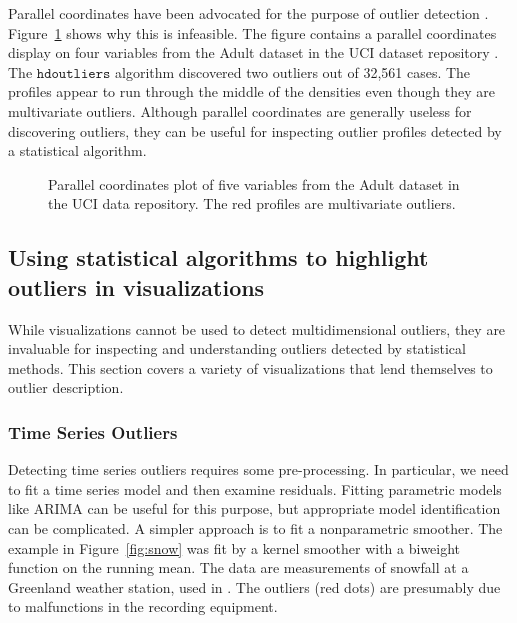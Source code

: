 \documentclass[12pt]{article}
\begin{document}
Parallel coordinates have been advocated for the purpose of outlier detection \citep{Novotny:2006:OFV:1187627.1187805}. Figure~\ref{fig:parallelcoordinates} shows why this is infeasible. The figure contains a parallel coordinates display on four variables from the Adult dataset in the UCI dataset repository \citep{adult}. The $\mathtt{hdoutliers}$ algorithm discovered two outliers out of 32,561 cases. The profiles appear to run through the middle of the densities even though they are multivariate outliers. Although parallel coordinates are generally useless for discovering outliers, they can be useful for inspecting outlier profiles detected by a statistical algorithm.

\begin{figure}[h]
\caption{\label{fig:parallelcoordinates}  Parallel coordinates plot of five variables from the Adult dataset in the UCI data repository. The red profiles are multivariate outliers.}
\end{figure}

\subsection{Using statistical algorithms to highlight outliers in visualizations}
While visualizations cannot be used to detect multidimensional outliers, they are invaluable for inspecting and understanding outliers detected by statistical methods. This section covers a variety of visualizations that lend themselves to outlier description.

\subsubsection{Time Series Outliers}
Detecting time series outliers requires some pre-processing. In particular, we need to fit a time series model and then examine residuals. Fitting parametric models like ARIMA \citep{BoxJenkins} can be useful for this purpose, but appropriate model identification can be complicated. A simpler approach is to fit a nonparametric smoother. The example in Figure~\ref{fig:snow} was fit by a kernel smoother with a biweight function on the running mean. The data are measurements of snowfall at a Greenland weather station, used in \cite{GoG}. The outliers (red dots) are presumably due to malfunctions in the recording equipment.
\end{document}
